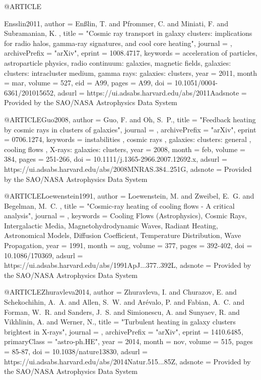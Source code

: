 \documentclass[useAMS,usenatbib]{mnras}
\begin{document}
{{{{{{@ARTICLE{Ensslin2011,
   author = {{En{\ss}lin}, T. and {Pfrommer}, C. and {Miniati}, F. and {Subramanian}, K.
	},
    title = "{Cosmic ray transport in galaxy clusters: implications for radio halos, gamma-ray signatures, and cool core heating}",
  journal = {\aap},
archivePrefix = "arXiv",
   eprint = {1008.4717},
 keywords = {acceleration of particles, astroparticle physics, radio continuum: galaxies, magnetic fields, galaxies: clusters: intracluster medium, gamma rays: galaxies: clusters},
     year = 2011,
    month = mar,
   volume = 527,
      eid = {A99},
    pages = {A99},
      doi = {10.1051/0004-6361/201015652},
   adsurl = {https://ui.adsabs.harvard.edu/abs/2011Aadsnote = {Provided by the SAO/NASA Astrophysics Data System}
}

@ARTICLE{Guo2008,
   author = {{Guo}, F. and {Oh}, S.~P.},
    title = "{Feedback heating by cosmic rays in clusters of galaxies}",
  journal = {\mnras},
archivePrefix = "arXiv",
   eprint = {0706.1274},
 keywords = {instabilities , cosmic rays , galaxies: clusters: general , cooling flows , X-rays: galaxies: clusters},
     year = 2008,
    month = feb,
   volume = 384,
    pages = {251-266},
      doi = {10.1111/j.1365-2966.2007.12692.x},
   adsurl = {https://ui.adsabs.harvard.edu/abs/2008MNRAS.384..251G},
  adsnote = {Provided by the SAO/NASA Astrophysics Data System}
}

@ARTICLE{Loewenstein1991,
   author = {{Loewenstein}, M. and {Zweibel}, E.~G. and {Begelman}, M.~C.
	},
    title = "{Cosmic-ray heating of cooling flows - A critical analysis}",
  journal = {\apj},
 keywords = {Cooling Flows (Astrophysics), Cosmic Rays, Intergalactic Media, Magnetohydrodynamic Waves, Radiant Heating, Astronomical Models, Diffusion Coefficient, Temperature Distribution, Wave Propagation},
     year = 1991,
    month = aug,
   volume = 377,
    pages = {392-402},
      doi = {10.1086/170369},
   adsurl = {https://ui.adsabs.harvard.edu/abs/1991ApJ...377..392L},
  adsnote = {Provided by the SAO/NASA Astrophysics Data System}
}

@ARTICLE{Zhuravleva2014,
   author = {{Zhuravleva}, I. and {Churazov}, E. and {Schekochihin}, A.~A. and 
	{Allen}, S.~W. and {Ar{\'e}valo}, P. and {Fabian}, A.~C. and 
	{Forman}, W.~R. and {Sanders}, J.~S. and {Simionescu}, A. and 
	{Sunyaev}, R. and {Vikhlinin}, A. and {Werner}, N.},
    title = "{Turbulent heating in galaxy clusters brightest in X-rays}",
  journal = {\nat},
archivePrefix = "arXiv",
   eprint = {1410.6485},
 primaryClass = "astro-ph.HE",
     year = 2014,
    month = nov,
   volume = 515,
    pages = {85-87},
      doi = {10.1038/nature13830},
   adsurl = {https://ui.adsabs.harvard.edu/abs/2014Natur.515...85Z},
  adsnote = {Provided by the SAO/NASA Astrophysics Data System}
}

}}}}}}}
\end{document}
